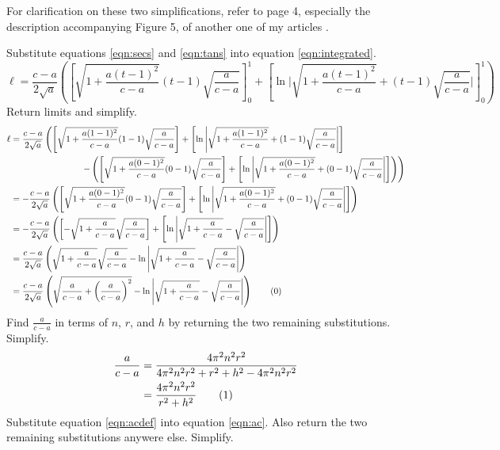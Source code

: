 \documentclass{article}
\begin{document}
For clarification on these two simplifications, refer to page 4, especially the description accompanying Figure 5, of another one of my articles \cite{Bib:SORVolumes}.\par
Substitute equations \ref{eqn:secs} and \ref{eqn:tans} into equation \ref{eqn:integrated}.
\begin{equation*}
    \ell = \frac{c-a}{2\sqrt{a}}\left(\left[\sqrt{1+\frac{a(t-1)^2}{c-a}}(t-1)\sqrt{\frac{a}{c-a}}\right]_0^1+\left[\ln\Bigg|\sqrt{1+\frac{a(t-1)^2}{c-a}}+(t-1)\sqrt{\frac{a}{c-a}}\Bigg|\right]_0^1\right)
\end{equation*}
Return limits and simplify.
\begin{align*}
    \ell &= \frac{c-a}{2\sqrt{a}}\left(\left[\sqrt{1+\frac{a(1-1)^2}{c-a}}(1-1)\sqrt{\frac{a}{c-a}}\right]+\left[\ln\Bigg|\sqrt{1+\frac{a(1-1)^2}{c-a}}+(1-1)\sqrt{\frac{a}{c-a}}\Bigg|\right]\right.\\
    &\hspace{8em} \left.-\left(\left[\sqrt{1+\frac{a(0-1)^2}{c-a}}(0-1)\sqrt{\frac{a}{c-a}}\right]+\left[\ln\Bigg|\sqrt{1+\frac{a(0-1)^2}{c-a}}+(0-1)\sqrt{\frac{a}{c-a}}\Bigg|\right]\right)\right)\\
    &= -\frac{c-a}{2\sqrt{a}}\left(\left[\sqrt{1+\frac{a(0-1)^2}{c-a}}(0-1)\sqrt{\frac{a}{c-a}}\right]+\left[\ln\Bigg|\sqrt{1+\frac{a(0-1)^2}{c-a}}+(0-1)\sqrt{\frac{a}{c-a}}\Bigg|\right]\right)\\
    &= -\frac{c-a}{2\sqrt{a}}\left(\left[-\sqrt{1+\frac{a}{c-a}}\sqrt{\frac{a}{c-a}}\right]+\left[\ln\Bigg|\sqrt{1+\frac{a}{c-a}}-\sqrt{\frac{a}{c-a}}\Bigg|\right]\right)\\
    &= \frac{c-a}{2\sqrt{a}}\left(\sqrt{1+\frac{a}{c-a}}\sqrt{\frac{a}{c-a}}-\ln\Bigg|\sqrt{1+\frac{a}{c-a}}-\sqrt{\frac{a}{c-a}}\Bigg|\right)\\
    &= \frac{c-a}{2\sqrt{a}}\left(\sqrt{\frac{a}{c-a}+\left(\frac{a}{c-a}\right)^2}-\ln\Bigg|\sqrt{1+\frac{a}{c-a}}-\sqrt{\frac{a}{c-a}}\Bigg|\right)\tag{\theequation}\label{eqn:ac}
    \stepcounter{equation}
\end{align*}
Find $\frac{a}{c-a}$ in terms of $n$, $r$, and $h$ by returning the two remaining substitutions. Simplify.
\begin{align*}
    \frac{a}{c-a} &= \frac{4\pi^2n^2r^2}{4\pi^2n^2r^2+r^2+h^2-4\pi^2n^2r^2}\\
    &= \frac{4\pi^2n^2r^2}{r^2+h^2}\tag{\theequation}\label{eqn:acdef}
    \stepcounter{equation}
\end{align*}
Substitute equation \ref{eqn:acdef} into equation \ref{eqn:ac}. Also return the two remaining substitutions anywere else. Simplify.
\end{document}
